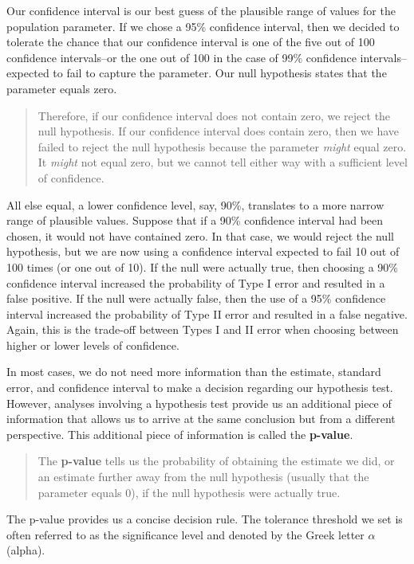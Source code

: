\documentclass[
]{book}
\begin{document}
Our confidence interval is our best guess of the plausible range of values for the population parameter. If we chose a 95\% confidence interval, then we decided to tolerate the chance that our confidence interval is one of the five out of 100 confidence intervals--or the one out of 100 in the case of 99\% confidence intervals--expected to fail to capture the parameter. Our null hypothesis states that the parameter equals zero.

\begin{quote}
Therefore, if our confidence interval does not contain zero, we reject the null hypothesis. If our confidence interval does contain zero, then we have failed to reject the null hypothesis because the parameter \emph{might} equal zero. It \emph{might} not equal zero, but we cannot tell either way with a sufficient level of confidence.
\end{quote}

All else equal, a lower confidence level, say, 90\%, translates to a more narrow range of plausible values. Suppose that if a 90\% confidence interval had been chosen, it would not have contained zero. In that case, we would reject the null hypothesis, but we are now using a confidence interval expected to fail 10 out of 100 times (or one out of 10). If the null were actually true, then choosing a 90\% confidence interval increased the probability of Type I error and resulted in a false positive. If the null were actually false, then the use of a 95\% confidence interval increased the probability of Type II error and resulted in a false negative. Again, this is the trade-off between Types I and II error when choosing between higher or lower levels of confidence.

In most cases, we do not need more information than the estimate, standard error, and confidence interval to make a decision regarding our hypothesis test. However, analyses involving a hypothesis test provide us an additional piece of information that allows us to arrive at the same conclusion but from a different perspective. This additional piece of information is called the \textbf{p-value}.

\begin{quote}
The \textbf{p-value} tells us the probability of obtaining the estimate we did, or an estimate further away from the null hypothesis (usually that the parameter equals 0), if the null hypothesis were actually true.
\end{quote}

The p-value provides us a concise decision rule. The tolerance threshold we set is often referred to as the significance level and denoted by the Greek letter \(\alpha\) (alpha).
\end{document}
